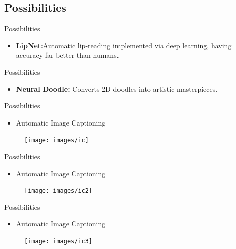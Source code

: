 \documentclass[10pt]{beamer}
\begin{document}
	\subsection{Possibilities}
	\begin{frame}[t]{Possibilities}
		\begin{itemize}
			\item \large{\textbf{LipNet:}Automatic lip-reading implemented via deep learning, having accuracy far better than humans.}
		\end{itemize}
	\end{frame}
	\begin{frame}[t]{Possibilities}
		\begin{itemize}
		\item \large{\textbf{Neural Doodle:} Converts 2D doodles into artistic masterpieces.}
		\end{itemize}
	\end{frame}
	\begin{frame}[t]{Possibilities}
		\begin{itemize}
			\item \large{Automatic Image Captioning}
		\end{itemize}
		\begin{figure}
		\texttt{[image: images/ic]}
		\end{figure}
	\end{frame}
	\begin{frame}[t]{Possibilities}
		\begin{itemize}
			\item \large{Automatic Image Captioning}
		\end{itemize}
		\begin{figure}
			\texttt{[image: images/ic2]}
		\end{figure}
	\end{frame}
	\begin{frame}[t]{Possibilities}
		\begin{itemize}
			\item \large{Automatic Image Captioning}
		\end{itemize}
		\begin{figure}
			\texttt{[image: images/ic3]}
		\end{figure}
	\end{frame}
\end{document}
